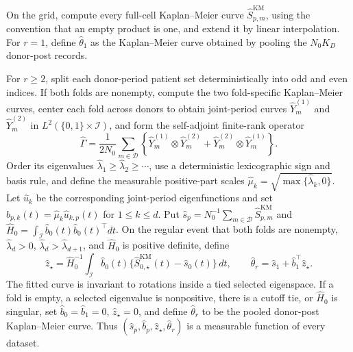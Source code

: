 On the grid, compute every full-cell Kaplan--Meier curve \(\widehat S^{\mathrm{KM}}_{p,m}\), using the convention that an empty product is one, and extend it by linear interpolation.  For \(r=1\), define \(\widehat\theta_1\) as the Kaplan--Meier curve obtained by pooling the \(N_0K_D\) donor-post records.

For \(r\ge2\), split each donor-period patient set deterministically into odd and even indices.  If both folds are nonempty, compute the two fold-specific Kaplan--Meier curves, center each fold across donors to obtain joint-period curves \(\widehat Y_m^{(1)}\) and \(\widehat Y_m^{(2)}\) in \(L^2(\{0,1\}\times\mathcal I)\), and form the self-adjoint finite-rank operator
\[
 \widehat\Gamma=\frac{1}{2N_0}\sum_{m\in\mathcal D}
 \left\{\widehat Y_m^{(1)}\otimes\widehat Y_m^{(2)}+
 \widehat Y_m^{(2)}\otimes\widehat Y_m^{(1)}\right\}.
\]
Order its eigenvalues \(\widehat\lambda_1\ge\widehat\lambda_2\ge\cdots\), use a deterministic lexicographic sign and basis rule, and define the measurable positive-part scales \(\widehat\mu_k=\sqrt{\max\{\widehat\lambda_k,0\}}\).  Let \(\widehat u_k\) be the corresponding joint-period eigenfunctions and set \(\widehat b_{p,k}(t)=\widehat\mu_k\widehat u_{k,p}(t)\) for \(1\le k\le d\).  Put \(\widehat s_p=N_0^{-1}\sum_{m\in\mathcal D}\widehat S^{\mathrm{KM}}_{p,m}\) and \(\widehat H_0=\int_{\mathcal I}\widehat b_0(t)\widehat b_0(t)^\top dt\).  On the regular event that both folds are nonempty, \(\widehat\lambda_d>0\), \(\widehat\lambda_d>\widehat\lambda_{d+1}\), and \(\widehat H_0\) is positive definite, define
\[
 \widehat z_\star=\widehat H_0^{-1}\int_{\mathcal I}\widehat b_0(t)
 \{\widehat S^{\mathrm{KM}}_{0,\star}(t)-\widehat s_0(t)\}\,dt,
 \qquad
 \widehat\theta_r=\widehat s_1+\widehat b_1^\top\widehat z_\star.
\]
The fitted curve is invariant to rotations inside a tied selected eigenspace.  If a fold is empty, a selected eigenvalue is nonpositive, there is a cutoff tie, or \(\widehat H_0\) is singular, set \(\widehat b_0=\widehat b_1=0\), \(\widehat z_\star=0\), and define \(\widehat\theta_r\) to be the pooled donor-post Kaplan--Meier curve.  Thus \((\widehat s_p,\widehat b_p,\widehat z_\star,\widehat\theta_r)\) is a measurable function of every dataset.

